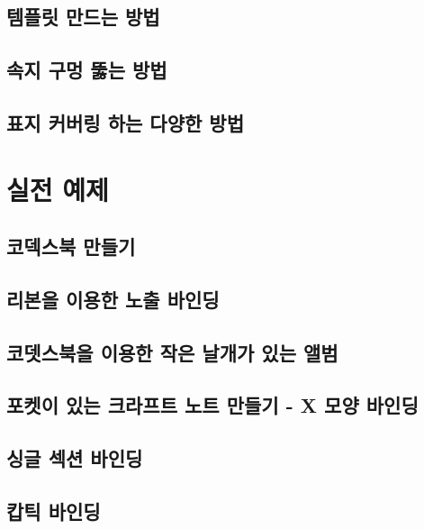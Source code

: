 \documentclass[12pt, a4paper, oneside]{book}
\begin{document}
	\section{템플릿 만드는 방법}


	\section{속지 구멍 뚫는 방법}

	\section{표지 커버링 하는 다양한 방법}


	\newpage
	\chapter{실전 예제}



	\section{코덱스북 만들기}
	\section{리본을 이용한 노출 바인딩}
	\section{코뎃스북을 이용한 작은 날개가 있는 앨범}
	\section{포켓이 있는 크라프트 노트 만들기 - X 모양 바인딩}
	\section{싱글 섹션 바인딩}
	\section{캅틱 바인딩}
\end{document}
